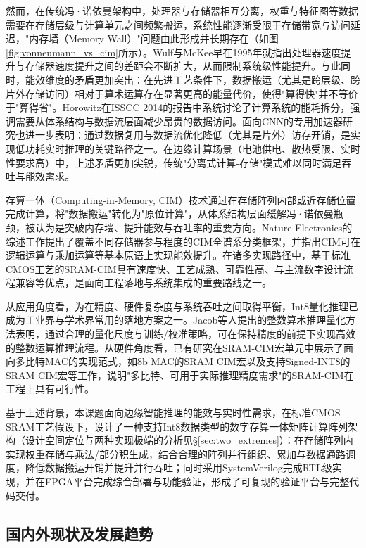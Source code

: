\documentclass[12pt, a4paper]{article}
\begin{document}
然而，在传统冯·诺依曼架构中，处理器与存储器相互分离，权重与特征图等数据需要在存储层级与计算单元之间频繁搬运，系统性能逐渐受限于存储带宽与访问延迟，"内存墙（Memory Wall）"问题由此形成并长期存在（如图\ref{fig:vonneumann_vs_cim}所示）。Wulf与McKee早在1995年就指出处理器速度提升与存储器速度提升之间的差距会不断扩大，从而限制系统级性能提升\cite{1}。与此同时，能效维度的矛盾更加突出：在先进工艺条件下，数据搬运（尤其是跨层级、跨片外存储访问）相对于算术运算存在显著更高的能量代价，使得"算得快"并不等价于"算得省"。Horowitz在ISSCC 2014的报告中系统讨论了计算系统的能耗拆分，强调需要从体系结构与数据流层面减少昂贵的数据访问\cite{2}。面向CNN的专用加速器研究也进一步表明：通过数据复用与数据流优化降低（尤其是片外）访存开销，是实现低功耗实时推理的关键路径之一\cite{3}。在边缘计算场景（电池供电、散热受限、实时性要求高）中，上述矛盾更加尖锐，传统"分离式计算-存储"模式难以同时满足吞吐与能效需求。

存算一体（Computing-in-Memory, CIM）技术通过在存储阵列内部或近存储位置完成计算，将"数据搬运"转化为"原位计算"，从体系结构层面缓解冯·诺依曼瓶颈，被认为是突破内存墙、提升能效与吞吐率的重要方向。Nature Electronics的综述工作提出了覆盖不同存储器参与程度的CIM全谱系分类框架，并指出CIM可在逻辑运算与乘加运算等基本原语上实现能效提升\cite{4}。在诸多实现路径中，基于标准CMOS工艺的SRAM-CIM具有速度快、工艺成熟、可靠性高、与主流数字设计流程兼容等优点，是面向工程落地与系统集成的重要路线之一\cite{5}。

从应用角度看，为在精度、硬件复杂度与系统吞吐之间取得平衡，Int8量化推理已成为工业界与学术界常用的落地方案之一。Jacob等人提出的整数算术推理量化方法表明，通过合理的量化尺度与训练/校准策略，可在保持精度的前提下实现高效的整数运算推理流程\cite{6}。从硬件角度看，已有研究在SRAM-CIM宏单元中展示了面向多比特MAC的实现范式，如8b MAC的SRAM CIM宏以及支持Signed-INT8的SRAM CIM宏等工作，说明"多比特、可用于实际推理精度需求"的SRAM-CIM在工程上具有可行性\cite{8}。

基于上述背景，本课题面向边缘智能推理的能效与实时性需求，在标准CMOS SRAM工艺假设下，设计了一种支持Int8数据类型的数字存算一体矩阵计算阵列架构（设计空间定位与两种实现极端的分析见§\ref{sec:two_extremes}）：在存储阵列内实现权重存储与乘法/部分积生成，结合合理的阵列并行组织、累加与数据通路调度，降低数据搬运开销并提升并行吞吐；同时采用SystemVerilog完成RTL级实现，并在FPGA平台完成综合部署与功能验证，形成了可复现的验证平台与完整代码交付。

\subsection{国内外现状及发展趋势}
\end{document}
